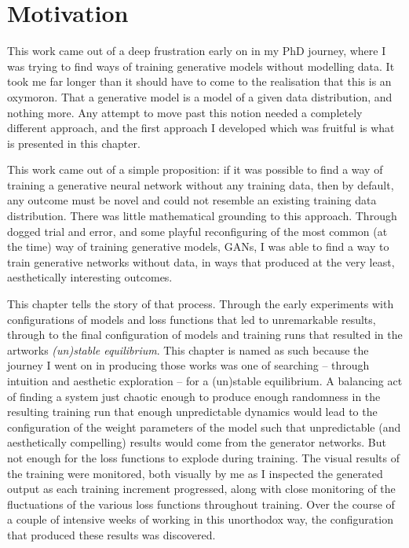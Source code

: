 \section{Motivation}

This work came out of a deep frustration early on in my PhD journey, where I was trying to find ways of training generative models without modelling data.
It took me far longer than it should have to come to the realisation that this is an oxymoron. 
That a generative model is a model of a given data distribution, and nothing more. 
Any attempt to move past this notion needed a completely different approach, and the first approach I developed which was fruitful is what is presented in this chapter. 

This work came out of a simple proposition: if it was possible to find a way of training a generative neural network without any training data, then by default, any outcome must be novel and could not resemble an existing training data distribution. 
There was little mathematical grounding to this approach. 
Through dogged trial and error, and some playful reconfiguring of the most common (at the time) way of training generative models, GANs, I was able to find a way to train generative networks without data, in ways that produced at the very least, aesthetically interesting outcomes. 

This chapter tells the story of that process. 
Through the early experiments with configurations of models and loss functions that led to unremarkable results, through to the final configuration of models and training runs that resulted in the artworks \textit{(un)stable equilibrium}.
This chapter is named as such because the journey I went on in producing those works was one of searching -- through intuition and aesthetic exploration -- for a (un)stable equilibrium. 
A balancing act of finding a system just chaotic enough to produce enough randomness in the resulting training run that enough unpredictable dynamics would lead to the configuration of the weight parameters of the model such that unpredictable (and aesthetically compelling) results would come from the generator networks. 
But not enough for the loss functions to explode during training. 
The visual results of the training were monitored, both visually by me as I inspected the generated output as each training increment progressed, along with close monitoring of the fluctuations of the various loss functions throughout training. 
Over the course of a couple of intensive weeks of working in this unorthodox way, the configuration that produced these results was discovered. 

